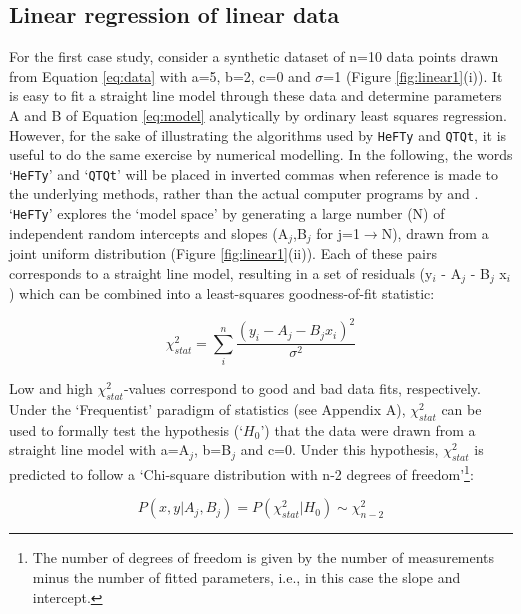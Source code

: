 \documentclass{article}
\begin{document}
\subsection{Linear regression of linear data}
\label{sec:linear}

For the first case study, consider a synthetic dataset of n=10 data
points drawn from Equation \ref{eq:data} with a=5, b=2, c=0 and
$\sigma$=1 (Figure \ref{fig:linear1}(i)). It is easy to fit a straight
line model through these data and determine parameters A and B of
Equation \ref{eq:model} analytically by ordinary least squares
regression. However, for the sake of illustrating the algorithms used
by {\tt HeFTy} and {\tt QTQt}, it is useful to do the same exercise by
numerical modelling. In the following, the words `{\tt HeFTy}' and
`{\tt QTQt}' will be placed in inverted commas when reference is made
to the underlying methods, rather than the actual computer programs by
\cite{ketcham2005} and \cite{gallagher2012}.\\

`{\tt HeFTy}' explores the `model space' by generating a large number
(N) of independent random intercepts and slopes (A$_j$,B$_j$ for
j=1$\rightarrow$N), drawn from a joint uniform distribution (Figure
\ref{fig:linear1}(ii)). Each of these pairs corresponds to a straight
line model, resulting in a set of residuals (y$_i$ - A$_j$ - B$_j$
x$_i$) which can be combined into a least-squares goodness-of-fit
statistic:

\begin{equation}
\chi_{stat}^2 = \sum_i^{n} \frac{\left(y_i - A_j - B_j x_i\right)^2}{\sigma^2}
\label{eq:chi2}
\end{equation}

Low and high $\chi_{stat}^2$-values correspond to good and bad data
fits, respectively. Under the `Frequentist' paradigm of statistics
(see Appendix A), $\chi_{stat}^2$ can be used to formally test the
hypothesis (`$H_0$') that the data were drawn from a straight line
model with a=A$_j$, b=B$_j$ and c=0.  Under this hypothesis,
$\chi_{stat}^2$ is predicted to follow a `Chi-square distribution with
n-2 degrees of freedom'\footnote{The number of degrees of freedom is
  given by the number of measurements minus the number of fitted
  parameters, i.e., in this case the slope and intercept.}:

\begin{equation}
P(x,y|A_j,B_j) = P(\chi_{stat}^2|H_0) \sim \chi^2_{n-2}
\label{eq:likelihood}
\end{equation}
\end{document}

